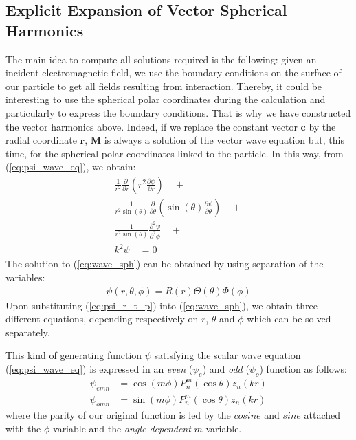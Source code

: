 \documentclass{article}
\numberwithin{equation}{section}
\begin{document}
\subsection{Explicit Expansion of Vector Spherical Harmonics}

The main idea to compute all solutions required is the following: given an incident electromagnetic field, we use the boundary conditions on the surface of our particle to get all fields resulting from interaction. Thereby, it could be interesting to use the spherical polar coordinates during the calculation and particularly to express the boundary conditions. That is why we have constructed the vector harmonics above. Indeed, if we replace the constant vector $\textbf{c}$ by the radial coordinate $\textbf{r}$, $\textbf{M}$ is always a solution of the vector wave equation but, this time, for the spherical polar coordinates linked to the particle. In this way, from (\ref{eq:psi_wave_eq}), we obtain:
\begin{equation}\label{eq:wave_sph}
\begin{aligned}
\frac{1}{r^{2}}\frac{\partial }{\partial r}\left(r^{2}\frac{\partial \psi}{\partial r}\right) \quad + \\ 
\frac{1}{r^{2}\sin(\theta)}\frac{\partial }{\partial \theta}\left(\sin(\theta)\frac{\partial \psi}{\partial \theta}\right) \quad + \\
\frac{1}{r^{2}\sin(\theta)}\frac{\partial^{2} \psi}{\partial^{2} \phi} \quad + \\
k^{2}\psi \quad = 0
\end{aligned}
\end{equation}
The solution to (\ref{eq:wave_sph}) can be obtained by using separation of the variables:
\begin{align}\label{eq:psi_r_t_p}
\psi(r, \theta, \phi) = R(r)\Theta(\theta)\Phi(\phi)
\end{align}
Upon substituting (\ref{eq:psi_r_t_p}) into (\ref{eq:wave_sph}), we obtain three different equations, depending respectively on $r$, $\theta$ and $\phi$ which can be solved separately.

This kind of generating function $\psi$ satisfying the scalar wave equation (\ref{eq:psi_wave_eq}) is expressed in an \textit{even} ($\psi_e$) and \textit{odd} ($\psi_o$) function as follows:
\begin{align}
\psi_{emn}&=\cos(m\phi)P_{n}^{m}(\cos\theta)z_{n}(kr)\\
\psi_{omn}&=\sin(m\phi)P_{n}^{m}(\cos\theta)z_{n}(kr)
\end{align}
where the parity of our original function is led by the $cosine$ and $sine$ attached with the $\phi$ variable and the \textit{angle-dependent} $m$ variable. 
\end{document}
